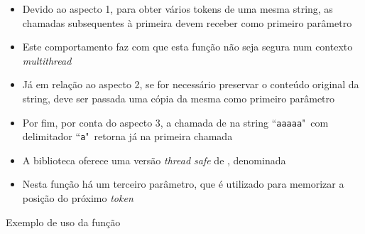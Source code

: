\begin{frame}[fragile]{}

    \begin{itemize}
        \item Devido ao aspecto 1, para obter vários tokens de uma mesma string, as chamadas 
            subsequentes à primeira devem receber  como primeiro parâmetro

        \item Este comportamento faz com que esta função não seja segura num contexto \textit{multithread}

        \item Já em relação ao aspecto 2, se for necessário preservar o conteúdo original da string, deve ser passada uma cópia da mesma como primeiro parâmetro

        \item Por fim, por conta do aspecto 3, a chamada de  na string
            ``\texttt{aaaaa}"\ com delimitador ``\texttt{a}"\ retorna  já na 
            primeira chamada

        \item A biblioteca  oferece uma versão \textit{thread safe} de , denominada 

        \item Nesta função há um terceiro parâmetro, que é utilizado para memorizar a posição do próximo \textit{token}
    \end{itemize}

\end{frame}

\begin{frame}[fragile]{Exemplo de uso da função }
\end{frame}


